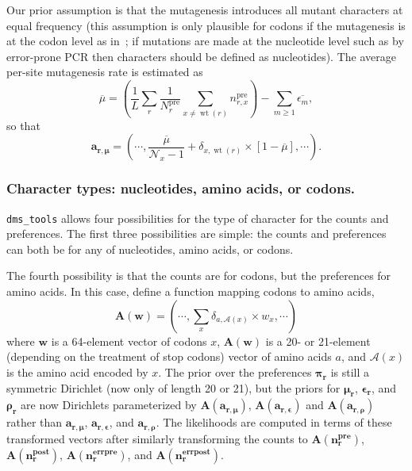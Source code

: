\documentclass[twocolumn]{bmcart}%
\begin{document}
Our prior assumption is that the mutagenesis introduces all mutant characters at equal frequency (this assumption is only plausible for codons if the mutagenesis is at the codon level as in~\cite{firnberg2012,jain2013rapid,firnberg2014comprehensive,bloom2014experimentally,melnikov2014comprehensive}; if mutations are made at the nucleotide level such as by error-prone PCR then characters should be defined as nucleotides). The average per-site mutagenesis rate is estimated as
\begin{equation}
\label{eq:avgmu}
\overline{\mu} = \left(\frac{1}{L}\sum\limits_r \frac{1}{N_r^{\textrm{pre}}}\sum\limits_{x\ne \operatorname{wt}\left(r\right)} n_{r,x}^{\textrm{pre}}\right) - \sum\limits_{m \ge 1} \overline{\epsilon_m},
\end{equation}
so that
\begin{equation}
\boldsymbol{\mathbf{a_{r,\mu}}} = \left(\cdots, \frac{\overline{\mu}}{\mathcal{N}_x - 1} + \delta_{x,\operatorname{wt}\left(r\right)} \times \left[1 - \overline{\mu}\right] ,\cdots\right). \label{eq:armu}
\end{equation}

\subsubsection*{Character types: nucleotides, amino acids, or codons.}
\texttt{dms\_tools} allows four possibilities for the type of character for the counts and preferences. The first three possibilities are simple: the counts and preferences can both be for any of nucleotides, amino acids, or codons. 

The fourth possibility is that the counts are for codons, but the preferences for amino acids. In this case, define a function mapping codons to amino acids, 
\begin{equation}
\label{eq:A}
\mathbf{A}\left(\mathbf{w}\right) = \left(\cdots, \sum\limits_x \delta_{a,\mathcal{A}\left(x\right)} \times w_x, \cdots\right)
\end{equation}
where $\mathbf{w}$ is a 64-element vector of codons $x$, $\mathbf{A}\left(\mathbf{w}\right)$ is a 20- or 21-element (depending on the treatment of stop codons) vector of amino acids $a$, and $\mathcal{A}\left(x\right)$ is the amino acid encoded by $x$. The prior over the preferences $\boldsymbol{\mathbf{\pi_r}}$ is still a symmetric Dirichlet (now only of length 20 or 21), but the priors for $\boldsymbol{\mathbf{\mu_r}}$, $\boldsymbol{\mathbf{\epsilon_r}}$, and $\boldsymbol{\mathbf{\rho_r}}$ are now Dirichlets parameterized by $\mathbf{A}\left(\boldsymbol{\mathbf{a_{r,\mu}}}\right)$, $\mathbf{A}\left(\boldsymbol{\mathbf{a_{r,\epsilon}}}\right)$ and $\mathbf{A}\left(\boldsymbol{\mathbf{a_{r,\rho}}}\right)$ rather than $\boldsymbol{\mathbf{a_{r,\mu}}}$, $\boldsymbol{\mathbf{a_{r,\epsilon}}}$, and $\boldsymbol{\mathbf{a_{r,\rho}}}$. The likelihoods are computed in terms of these transformed vectors after similarly transforming the counts to $\mathbf{A}\left(\mathbf{n_r^{\textbf{pre}}}\right)$, $\mathbf{A}\left(\mathbf{n_r^{\textbf{post}}}\right)$, $\mathbf{A}\left(\mathbf{n_r^{\textbf{errpre}}}\right)$, and $\mathbf{A}\left(\mathbf{n_r^{\textbf{errpost}}}\right)$.
\end{document}
